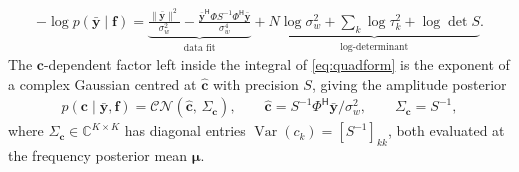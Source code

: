 \documentclass[journal,onecolumn]{IEEEtran}
\begin{document}
\begin{eqnarray}
\label{eq:marginal}
-\log p(\bar{\mathbf{y}}\mid\mathbf{f})
=\underbrace{\frac{\|\bar{\mathbf{y}}\|^2}{\sigma_w^2}-\frac{\bar{\mathbf{y}}^{\mathsf H}\Phi S^{-1}\Phi^{\mathsf H}\bar{\mathbf{y}}}{\sigma_w^4}}_{\text{data fit}}
+\underbrace{N\log\sigma_w^2+\sum_k\log\tau_k^2+\log\det S}_{\text{log-determinant}}.
\end{eqnarray}
The $\mathbf{c}$-dependent factor left inside the integral of \eqref{eq:quadform} is the exponent of a complex Gaussian centred at $\hat{\mathbf{c}}$ with precision $S$, giving the amplitude posterior
\begin{eqnarray}
\label{eq:cpost}
p(\mathbf{c}\mid\bar{\mathbf{y}},\mathbf{f})=\mathcal{CN}(\hat{\mathbf{c}},\,\Sigma_{\mathbf{c}}),\qquad
\hat{\mathbf{c}}=S^{-1}\Phi^{\mathsf H}\bar{\mathbf{y}}/\sigma_w^2,\qquad
\Sigma_{\mathbf{c}}=S^{-1},
\end{eqnarray}
where $\Sigma_{\mathbf{c}}\in\mathbb{C}^{K\times K}$ has diagonal entries $\operatorname{Var}(c_k)=[S^{-1}]_{kk}$, both evaluated at the frequency posterior mean $\pmb{\mu}$.
\end{document}
